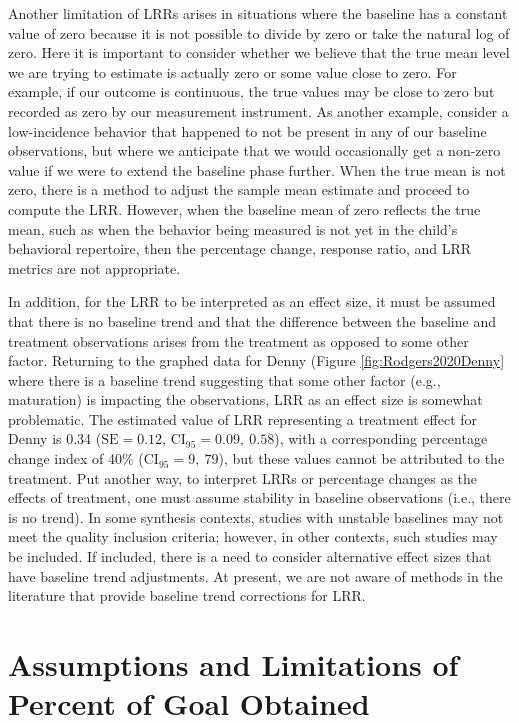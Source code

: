 \documentclass[
]{book}
\begin{document}
Another limitation of LRRs arises in situations where the baseline has a constant value of zero because it is not possible to divide by zero or take the natural log of zero. Here it is important to consider whether we believe that the true mean level we are trying to estimate is actually zero or some value close to zero. For example, if our outcome is continuous, the true values may be close to zero but recorded as zero by our measurement instrument. As another example, consider a low-incidence behavior that happened to not be present in any of our baseline observations, but where we anticipate that we would occasionally get a non-zero value if we were to extend the baseline phase further. When the true mean is not zero, there is a method to adjust the sample mean estimate \citep{Pustejovsky2015Measurement} and proceed to compute the LRR. However, when the baseline mean of zero reflects the true mean, such as when the behavior being measured is not yet in the child's behavioral repertoire, then the percentage change, response ratio, and LRR metrics are not appropriate.

In addition, for the LRR to be interpreted as an effect size, it must be assumed that there is no baseline trend and that the difference between the baseline and treatment observations arises from the treatment as opposed to some other factor. Returning to the graphed data for Denny (Figure \ref{fig:Rodgers2020Denny} where there is a baseline trend suggesting that some other factor (e.g., maturation) is impacting the observations, LRR as an effect size is somewhat problematic. The estimated value of LRR representing a treatment effect for Denny is 0.34 (\(\text{SE} = 0.12\), \(\text{CI}_{95} = 0.09, \ 0.58\)), with a corresponding percentage change index of 40\(\%\) (\(\text{CI}_{95} = 9, \ 79\)), but these values cannot be attributed to the treatment. Put another way, to interpret LRRs or percentage changes as the effects of treatment, one must assume stability in baseline observations (i.e., there is no trend). In some synthesis contexts, studies with unstable baselines may not meet the quality inclusion criteria; however, in other contexts, such studies may be included. If included, there is a need to consider alternative effect sizes that have baseline trend adjustments. At present, we are not aware of methods in the literature that provide baseline trend corrections for LRR.

\hypertarget{assumptions-and-limitations-of-percent-of-goal-obtained}{%
\section{Assumptions and Limitations of Percent of Goal Obtained}\label{assumptions-and-limitations-of-percent-of-goal-obtained}}
\end{document}
